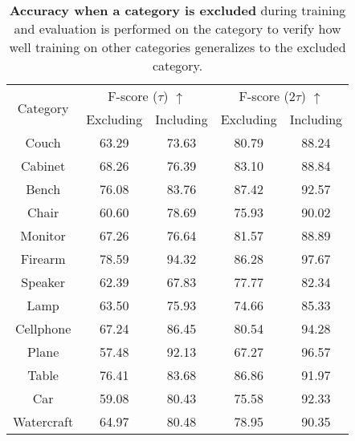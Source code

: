 \begin{table}[ht]
\begin{center}
\footnotesize
\begin{tabular}{| c | c c | c c|}
    \hline
    \multirow{2}{*}{Category}&
    \multicolumn{2}{c|}{F-score ($\tau$) $\uparrow$}&
    \multicolumn{2}{c|}{F-score ($2\tau$) $\uparrow$}\\
    & Excluding & Including
    & Excluding & Including \\
    \hline
    Couch       & 63.29 & 73.63 & 80.79 & 88.24 \\
    Cabinet     & 68.26 & 76.39 & 83.10 & 88.84 \\
    Bench       & 76.08 & 83.76 & 87.42 & 92.57 \\
    Chair       & 60.60 & 78.69 & 75.93 & 90.02 \\
    Monitor     & 67.26 & 76.64 & 81.57 & 88.89 \\
    Firearm     & 78.59 & 94.32 & 86.28 & 97.67 \\
    Speaker     & 62.39 & 67.83 & 77.77 & 82.34 \\
    Lamp        & 63.50 & 75.93 & 74.66 & 85.33 \\
    Cellphone   & 67.24 & 86.45 & 80.54 & 94.28 \\
    Plane       & 57.48 & 92.13 & 67.27 & 96.57 \\
    Table       & 76.41 & 83.68 & 86.86 & 91.97 \\
    Car         & 59.08 & 80.43 & 75.58 & 92.33 \\
    Watercraft  & 64.97 & 80.48 & 78.95 & 90.35 \\
    \hline
\end{tabular}
\end{center}
\caption{
    \textbf{Accuracy when a category is excluded} during training and evaluation is performed on the category to verify how well training on other categories generalizes to the excluded category.
}
\label{table:train_except_one_category}
\end{table}

